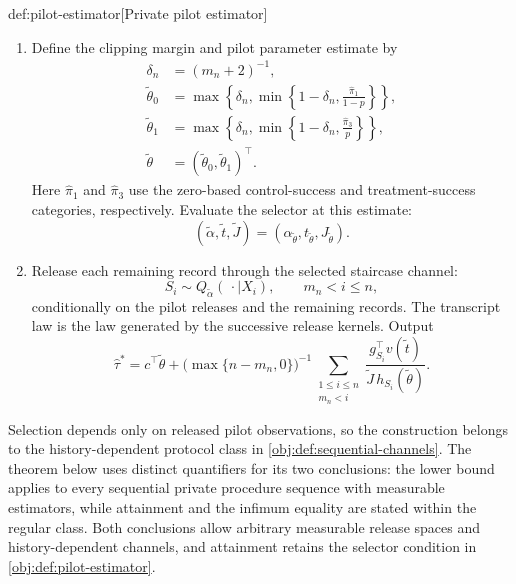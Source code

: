 \documentclass[11pt]{article}
\begin{document}
\begin{algorithmv}{def:pilot-estimator}[Private pilot estimator]
\begin{enumerate}
\item Define the clipping margin and pilot parameter estimate by
\[
\begin{aligned}
\delta_n&=(m_n+2)^{-1},\\
\widetilde\theta_0
&=\max\left\{\delta_n,
\min\left\{1-\delta_n,\frac{\widehat\pi_1}{1-p}\right\}\right\},\\
\widetilde\theta_1
&=\max\left\{\delta_n,
\min\left\{1-\delta_n,\frac{\widehat\pi_3}{p}\right\}\right\},\\
\widetilde\theta
&=(\widetilde\theta_0,\widetilde\theta_1)^{\top}.
\end{aligned}
\]
Here \(\widehat\pi_1\) and \(\widehat\pi_3\) use the zero-based control-success and treatment-success categories, respectively. Evaluate the selector at this estimate:
\[
(\widetilde\alpha,\widetilde t,\widetilde J)
=
(\alpha_{\widetilde\theta},
t_{\widetilde\theta},
J_{\widetilde\theta}).
\]

\item Release each remaining record through the selected staircase channel:
\[
S_i\sim Q_{\widetilde\alpha}(\,\cdot\mid X_i),
\qquad m_n<i\le n,
\]
conditionally on the pilot releases and the remaining records. The transcript law is the law generated by the successive release kernels. Output
\[
\widehat\tau^*
=
c^{\top}\widetilde\theta
+\bigl(\max\{n-m_n,0\}\bigr)^{-1}
\sum_{\substack{1\le i\le n\\m_n<i}}
\frac{g_{S_i}^{\top}v(\widetilde t)}
{\widetilde J\,h_{S_i}(\widetilde\theta)}.
\]
\end{enumerate}
\end{algorithmv}

Selection depends only on released pilot observations, so the construction belongs to the history-dependent protocol class in \cref{obj:def:sequential-channels}. The theorem below uses distinct quantifiers for its two conclusions: the lower bound applies to every sequential private procedure sequence with measurable estimators, while attainment and the infimum equality are stated within the regular class. Both conclusions allow arbitrary measurable release spaces and history-dependent channels, and attainment retains the selector condition in \cref{obj:def:pilot-estimator}.
\end{document}
